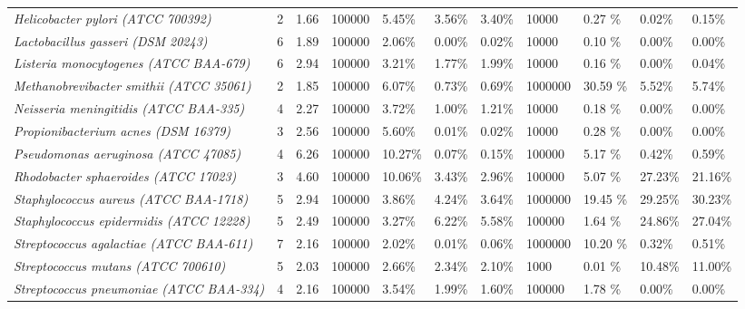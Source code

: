 \documentclass{article}
\begin{document}
\begin{landscape}
\begin{table}
\begin{tabular}{lllllllllll}
\textit{Helicobacter pylori (ATCC 700392)} & 2 & 1.66  & 100000 & 5.45\% & 3.56\% &  3.40\% & 10000 & 0.27 \%   & 0.02\%  & 0.15\% \\
\textit{Lactobacillus gasseri (DSM 20243)} & 6 & 1.89  & 100000 & 2.06\% & 0.00\% &  0.02\% & 10000 & 0.10 \%   & 0.00\%  & 0.00\% \\
\textit{Listeria monocytogenes (ATCC BAA-679)} & 6 & 2.94  & 100000 & 3.21\% & 1.77\% &  1.99\% & 10000 & 0.16 \%   & 0.00\%  & 0.04\% \\
\textit{Methanobrevibacter smithii (ATCC 35061)} & 2 & 1.85  & 100000 & 6.07\% & 0.73\% &  0.69\% & 1000000 & 30.59 \%   & 5.52\%  & 5.74\% \\
\textit{Neisseria meningitidis (ATCC BAA-335)} & 4 & 2.27  & 100000 & 3.72\% & 1.00\% &  1.21\% & 10000 & 0.18 \%   & 0.00\%  & 0.00\% \\
\textit{Propionibacterium acnes (DSM 16379)} & 3 & 2.56  & 100000 & 5.60\% & 0.01\% &  0.02\% & 10000 & 0.28 \%   & 0.00\%  & 0.00\% \\
\textit{Pseudomonas aeruginosa (ATCC 47085)} & 4 & 6.26  & 100000 & 10.27\% & 0.07\% &  0.15\% & 100000 & 5.17 \%   & 0.42\%  & 0.59\% \\
\textit{Rhodobacter sphaeroides (ATCC 17023)} & 3 & 4.60  & 100000 & 10.06\% & 3.43\% &  2.96\% & 100000 & 5.07 \%   & 27.23\%  & 21.16\% \\
\textit{Staphylococcus aureus (ATCC BAA-1718)} & 5 & 2.94  & 100000 & 3.86\% & 4.24\% &  3.64\% & 1000000 & 19.45 \%   & 29.25\%  & 30.23\% \\
\textit{Staphylococcus epidermidis (ATCC 12228)} & 5 & 2.49  & 100000 & 3.27\% & 6.22\% &  5.58\% & 100000 & 1.64 \%   & 24.86\%  & 27.04\% \\
\textit{Streptococcus agalactiae (ATCC BAA-611)} & 7 & 2.16  & 100000 & 2.02\% & 0.01\% &  0.06\% & 1000000 & 10.20 \%   & 0.32\%  & 0.51\% \\
\textit{Streptococcus mutans (ATCC 700610)} & 5 & 2.03  & 100000 & 2.66\% & 2.34\% &  2.10\% & 1000 & 0.01 \%   & 10.48\%  & 11.00\% \\
\textit{Streptococcus pneumoniae (ATCC BAA-334)} & 4 & 2.16  & 100000 & 3.54\% & 1.99\% &  1.60\% & 100000 & 1.78 \%   & 0.00\%  & 0.00\% \\
\hline
\end{tabular}
\end{table}
\end{landscape}
\end{document}
